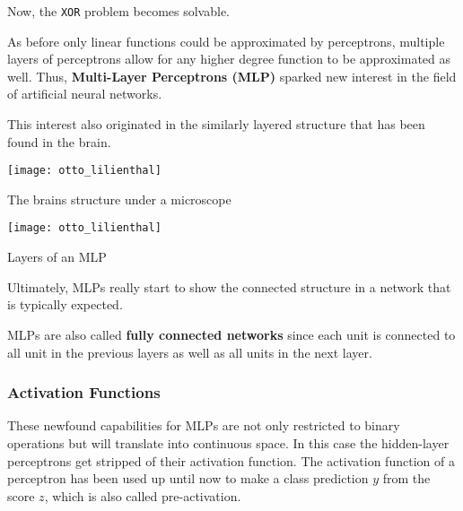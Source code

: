 Now, the \lstinline|XOR| problem becomes solvable.


As before only linear functions could be approximated by perceptrons, multiple layers of perceptrons allow for any higher degree function to be approximated as well.
Thus, \textbf{Multi-Layer Perceptrons (MLP)} sparked new interest in the field of artificial neural networks.

This interest also originated in the similarly layered structure that has been found in the brain.
\begin{marginfigure}
    \texttt{[image: otto\_lilienthal]}
    \caption[]{The brains structure under a microscope}
\end{marginfigure}
\begin{marginfigure}
    \texttt{[image: otto\_lilienthal]}
    \caption[]{Layers of an MLP}
\end{marginfigure}
Ultimately, MLPs really start to show the connected structure in a network that is typically expected.

MLPs are also called \textbf{fully connected networks} since each unit is connected to all unit in the previous layers as well as all units in the next layer.



\subsubsection{Activation Functions}
These newfound capabilities for MLPs are not only restricted to binary operations but will translate into continuous space.
In this case the hidden-layer perceptrons get stripped of their activation function.
The activation function of a perceptron has been used up until now to make a class prediction $y$ from the score $z$, which is also called pre-activation.

